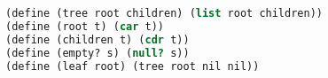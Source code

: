 \begin{lstlisting}[language=Scheme]
(define (tree root children) (list root children))
(define (root t) (car t))
(define (children t) (cdr t))
(define (empty? s) (null? s))
(define (leaf root) (tree root nil nil))
\end{lstlisting}
